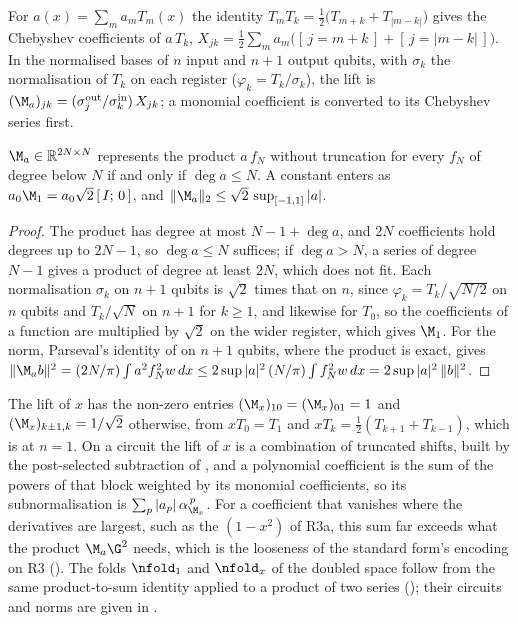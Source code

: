 For $a(x)=\sum_ma_mT_m(x)$ the identity $T_mT_k=\tfrac12\bigl(T_{m+k}+T_{|m-k|}\bigr)$ gives the Chebyshev coefficients of $a\,T_k$, $X_{jk}=\tfrac12\sum_ma_m\bigl([\,j=m+k\,]+[\,j=|m-k|\,]\bigr)$. In the normalised bases of $n$ input and $n+1$ output qubits, with $\sigma_k$ the normalisation of $T_k$ on each register ($\varphi_k=T_k/\sigma_k$), the lift is $(\M_a)_{jk}=(\sigma^{\mathrm{out}}_j/\sigma^{\mathrm{in}}_k)\,X_{jk}$; a monomial coefficient is converted to its Chebyshev series first.

\begin{proposition}
\label{prop:lift}
$\M_a\in\mathbb R^{2N\times N}$ represents the product $a\,f_N$ without truncation for every $f_N$ of degree below $N$ if and only if $\deg a\le N$. A constant enters as $a_0\M_1=a_0\sqrt2\,[\,I;\,0\,]$, and $\|\M_a\|_2\le\sqrt2\,\sup_{[-1,1]}|a|$.
\end{proposition}
\begin{proof}
The product has degree at most $N-1+\deg a$, and $2N$ coefficients hold degrees up to $2N-1$, so $\deg a\le N$ suffices; if $\deg a>N$, a series of degree $N-1$ gives a product of degree at least $2N$, which does not fit. Each normalisation $\sigma_k$ on $n+1$ qubits is $\sqrt2$ times that on $n$, since $\varphi_k=T_k/\sqrt{N/2}$ on $n$ qubits and $T_k/\sqrt N$ on $n+1$ for $k\ge1$, and likewise for $T_0$, so the coefficients of a function are multiplied by $\sqrt2$ on the wider register, which gives $\M_1$. For the norm, Parseval's identity of  on $n+1$ qubits, where the product is exact, gives $\|\M_ab\|^2=(2N/\pi)\int a^2f_N^2w\,dx\le2\sup|a|^2\,(N/\pi)\int f_N^2w\,dx=2\sup|a|^2\,\|b\|^2$.
\end{proof}

The lift of $x$ has the non-zero entries $(\M_x)_{10}=(\M_x)_{01}=1$ and $(\M_x)_{k\pm1,k}=1/\sqrt2$ otherwise, from $xT_0=T_1$ and $xT_k=\tfrac12(T_{k+1}+T_{k-1})$, which is  at $n=1$. On a circuit the lift of $x$ is a combination of truncated shifts, built by the post-selected subtraction of , and a polynomial coefficient is the sum of the powers of that block weighted by its monomial coefficients, so its subnormalisation is $\sum_p|a_p|\,\alpha_{\M_x}^{\,p}$. For a coefficient that vanishes where the derivatives are largest, such as the $(1-x^2)$ of R3a, this sum far exceeds what the product $\M_a\G^2$ needs, which is the looseness of the standard form's encoding on R3 (). The folds $\nfold_1$ and $\nfold_x$ of the doubled space follow from the same product-to-sum identity applied to a product of two series (); their circuits and norms are given in .
